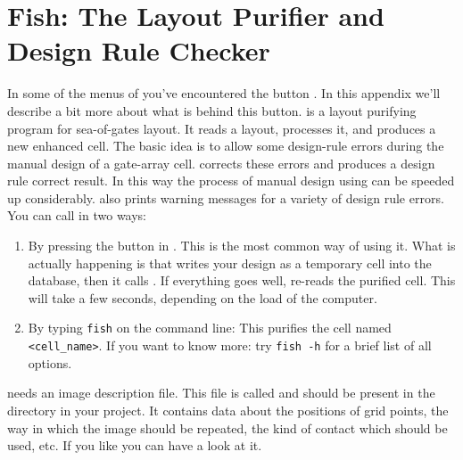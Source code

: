 \section{Fish: The Layout Purifier and Design Rule Checker}
\label{fish}
In some of the menus of  you've encountered the button
. In this appendix we'll describe a bit more
about what is behind this button.
 is a layout purifying program for sea-of-gates layout.
It reads a layout, processes it, and produces a new enhanced cell. The
basic idea is to allow some design-rule errors during the manual design
of a gate-array cell.
 corrects these errors and produces a design rule correct result.
In this way the process of manual design using  can be
speeded up considerably.  also prints warning messages for a
variety of design rule errors.  You can call  in two ways:
\begin{enumerate}
\item
By pressing the button  in . This is the
most common way of using it. What is actually happening is that
 writes your design as a temporary cell into the
database, then it calls . If everything goes well,
 re-reads the purified cell. This will take a few
seconds, depending on the load of the computer.
\item
By typing {\tt fish} on the command line:  This
purifies the cell named {\tt <cell\_name>}. If you want to know more:
try {\tt fish -h} for a brief list of all options.
\end{enumerate}

 needs an image description file. This file is
called  
and should be present in the directory
 in your project. It
contains data about the positions of grid points, the way in which the
image should be repeated, the kind of contact which should be used,
etc. If you like you can have a look at it.

